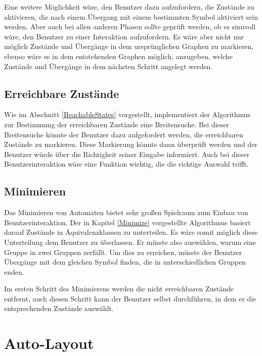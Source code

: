 Eine weitere Möglichkeit wäre, den Benutzer dazu aufzufordern, die Zustände zu
aktivieren, die nach einem Übergang mit einem bestimmten Symbol aktiviert sein
werden. Aber auch bei allen anderen Phasen sollte geprüft werden, ob es sinnvoll
wäre, den Benutzer zu einer Interaktion aufzufordern. Es wäre aber nicht nur
möglich Zustände und Übergänge in dem ursprünglichen Graphen zu markieren, ebenso
wäre es in dem entstehenden Graphen möglich, anzugeben, welche Zustände und
Übergänge in dem nächsten Schritt angelegt werden.\vspace{10pt}


\subsection{Erreichbare Zustände}
Wie im Abschnitt \ref{ReachableStates} vorgestellt, implementiert der
Algorithmus zur Bestimmung der erreichbaren Zustände eine Breitensuche. Bei
dieser Breitensuche könnte der Benutzer dazu aufgefordert werden, die
erreichbaren Zustände zu markieren. Diese Markierung könnte dann überprüft
werden und der Benutzer würde über die Richtigkeit seiner Eingabe informiert.
Auch bei dieser Benutzerinteraktion wäre eine Funktion wichtig, die die
richtige Auswahl trifft.\vspace{10pt}


\subsection{Minimieren}
Das Minimieren von Automaten bietet sehr großen Spielraum zum Einbau von
Benutzerinteraktion. Der in Kapitel \ref{Minimize} vorgestellte Algorithmus
basiert darauf Zustände in Äquivalenz\-klassen zu unterteilen. Es wäre somit
möglich diese Unterteilung dem Benutzer zu überlassen. Er müsste also
auswählen, warum eine Gruppe in zwei Gruppen zerfällt. Um dies zu erreichen,
müsste der Benutzer Übergänge mit dem gleichen Symbol finden, die in
unterschiedlichen Gruppen enden.\vspace{10pt}

Im ersten Schritt des Minimierens werden die nicht erreichbaren Zustände
entfernt, auch diesen Schritt kann der Benutzer selbst durchführen, in dem er die
entsprechenden Zustände auswählt.\vspace{10pt}


\section{Auto-Layout}\label{PerspectiveAutoLayout}

